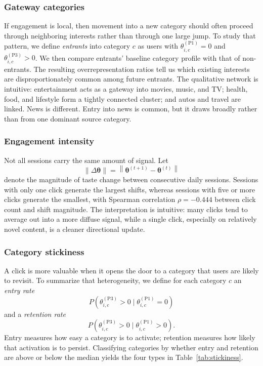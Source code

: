 \documentclass[11pt]{article}
\begin{document}
\subsubsection{Gateway categories}

If engagement is local, then movement into a new category should often proceed through neighboring interests rather than through one large jump. To study that pattern, we define \emph{entrants} into category $c$ as users with $\theta_{i,c}^{(\mathrm{P1})}=0$ and $\theta_{i,c}^{(\mathrm{P3})}>0$. We then compare entrants' baseline category profile with that of non-entrants. The resulting overrepresentation ratios tell us which existing interests are disproportionately common among future entrants. The qualitative network is intuitive: entertainment acts as a gateway into movies, music, and TV; health, food, and lifestyle form a tightly connected cluster; and autos and travel are linked. News is different. Entry into news is common, but it draws broadly rather than from one dominant source category.

\subsubsection{Engagement intensity}

Not all sessions carry the same amount of signal. Let
\[
\|\Delta\boldsymbol{\theta}\|
=
\left\|
\boldsymbol{\theta}^{(t+1)}-\boldsymbol{\theta}^{(t)}
\right\|
\]
denote the magnitude of taste change between consecutive daily sessions. Sessions with only one click generate the largest shifts, whereas sessions with five or more clicks generate the smallest, with Spearman correlation $\rho=-0.444$ between click count and shift magnitude. The interpretation is intuitive: many clicks tend to average out into a more diffuse signal, while a single click, especially on relatively novel content, is a cleaner directional update.

\subsubsection{Category stickiness}

A click is more valuable when it opens the door to a category that users are likely to revisit. To summarize that heterogeneity, we define for each category $c$ an \emph{entry rate}
\[
P\!\left(\theta_{i,c}^{(\mathrm{P3})}>0 \mid \theta_{i,c}^{(\mathrm{P1})}=0\right)
\]
and a \emph{retention rate}
\[
P\!\left(\theta_{i,c}^{(\mathrm{P3})}>0 \mid \theta_{i,c}^{(\mathrm{P1})}>0\right).
\]
Entry measures how easy a category is to activate; retention measures how likely that activation is to persist. Classifying categories by whether entry and retention are above or below the median yields the four types in Table~\ref{tab:stickiness}.
\end{document}

